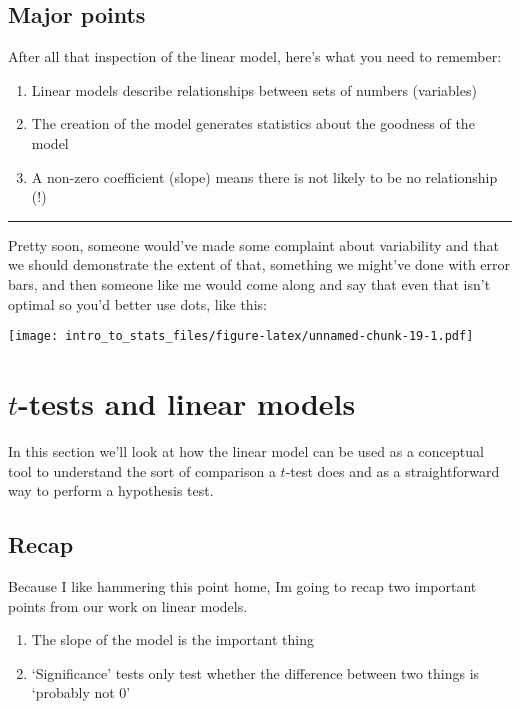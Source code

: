 \documentclass[]{book}
\providecommand{\tightlist}{%
  \setlength{\itemsep}{0pt}\setlength{\parskip}{0pt}}
\begin{document}
\hypertarget{major-points}{%
\section{Major points}\label{major-points}}

After all that inspection of the linear model, here's what you need to remember:

\begin{enumerate}
\def\labelenumi{\arabic{enumi}.}
\tightlist
\item
  Linear models describe relationships between sets of numbers (variables)
\item
  The creation of the model generates statistics about the goodness of the model
\item
  A non-zero coefficient (slope) means there is not likely to be no relationship (!)
\end{enumerate}

\begin{center}\rule{0.5\linewidth}{0.5pt}\end{center}

Pretty soon, someone would've made some complaint about variability and that we should demonstrate the extent of that, something we might've done with error bars, and then someone like me would come along and say that even that isn't optimal so you'd better use dots, like this:

\texttt{[image: intro\_to\_stats\_files/figure-latex/unnamed-chunk-19-1.pdf]}

\hypertarget{t-tests-and-linear-models}{%
\chapter{\texorpdfstring{\(t\)-tests and linear models}{t-tests and linear models}}\label{t-tests-and-linear-models}}

In this section we'll look at how the linear model can be used as a conceptual tool to understand the sort of comparison a \(t\)-test does and as a straightforward way to perform a hypothesis test.

\hypertarget{recap}{%
\section{Recap}\label{recap}}

Because I like hammering this point home, Im going to recap two important points from our work on linear models.

\begin{enumerate}
\def\labelenumi{\arabic{enumi}.}
\tightlist
\item
  The slope of the model is the important thing
\item
  `Significance' tests only test whether the difference between two things is `probably not 0'
\end{enumerate}
\end{document}
